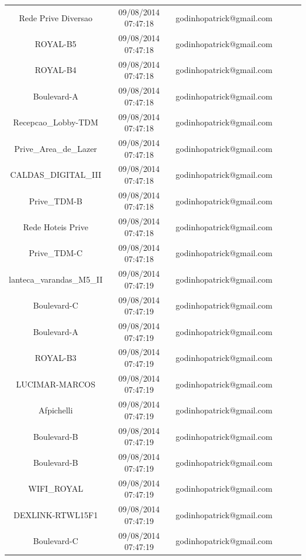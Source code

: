 \documentclass[12pt, %
openright, 
oneside,
a4paper,
brazil]{facom-ufu-abntex2}
\begin{document}
\begin{center}
\begin{longtable}{|c|c|c|c|c|c|}
Rede Prive Diversao               & 09/08/2014 07:47:18 & godinhopatrick@gmail.com \\
ROYAL-B5                          & 09/08/2014 07:47:18 & godinhopatrick@gmail.com \\
ROYAL-B4                          & 09/08/2014 07:47:18 & godinhopatrick@gmail.com \\
Boulevard-A                       & 09/08/2014 07:47:18 & godinhopatrick@gmail.com \\
Recepcao\_Lobby-TDM               & 09/08/2014 07:47:18 & godinhopatrick@gmail.com \\
Prive\_Area\_de\_Lazer            & 09/08/2014 07:47:18 & godinhopatrick@gmail.com \\
CALDAS\_DIGITAL\_III              & 09/08/2014 07:47:18 & godinhopatrick@gmail.com \\
Prive\_TDM-B                      & 09/08/2014 07:47:18 & godinhopatrick@gmail.com \\
Rede Hoteis Prive                 & 09/08/2014 07:47:18 & godinhopatrick@gmail.com \\
Prive\_TDM-C                      & 09/08/2014 07:47:18 & godinhopatrick@gmail.com \\
lanteca\_varandas\_M5\_II         & 09/08/2014 07:47:19 & godinhopatrick@gmail.com \\
Boulevard-C                       & 09/08/2014 07:47:19 & godinhopatrick@gmail.com \\
Boulevard-A                       & 09/08/2014 07:47:19 & godinhopatrick@gmail.com \\
ROYAL-B3                          & 09/08/2014 07:47:19 & godinhopatrick@gmail.com \\
LUCIMAR-MARCOS                    & 09/08/2014 07:47:19 & godinhopatrick@gmail.com \\
Afpichelli                        & 09/08/2014 07:47:19 & godinhopatrick@gmail.com \\
Boulevard-B                       & 09/08/2014 07:47:19 & godinhopatrick@gmail.com \\
Boulevard-B                       & 09/08/2014 07:47:19 & godinhopatrick@gmail.com \\
WIFI\_ROYAL                       & 09/08/2014 07:47:19 & godinhopatrick@gmail.com \\
DEXLINK-RTWL15F1                  & 09/08/2014 07:47:19 & godinhopatrick@gmail.com \\
Boulevard-C                       & 09/08/2014 07:47:19 & godinhopatrick@gmail.com \\

\end{longtable}
\end{center}
\end{document}
